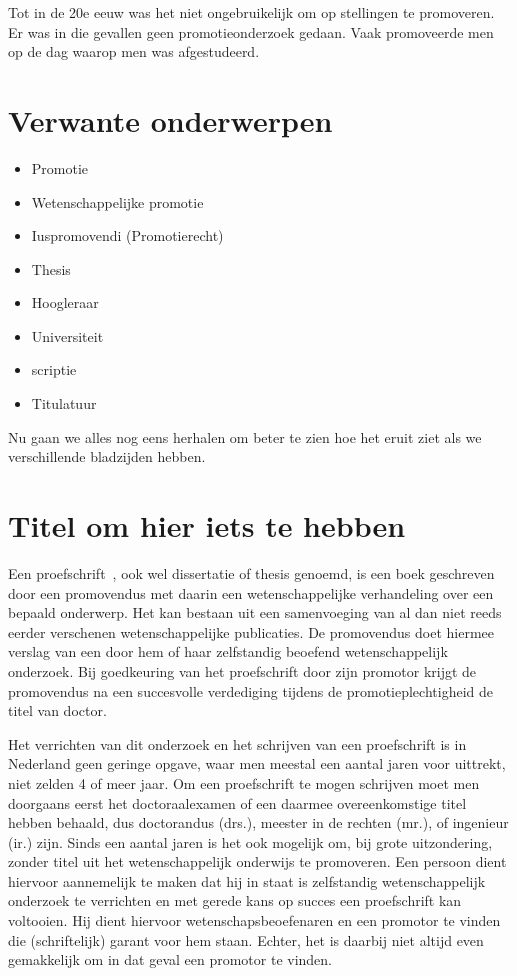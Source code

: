 Tot in de 20e eeuw was het niet ongebruikelijk om op stellingen te
promoveren. Er was in die gevallen geen promotieonderzoek gedaan. Vaak
promoveerde men op de dag waarop men was afgestudeerd.

\section{Verwante onderwerpen}
\label{sec:verwante-onderwerpen}

\begin{itemize}
\item Promotie~\cite{h2g2}
\item Wetenschappelijke promotie
\item Iuspromovendi (Promotierecht)
\item Thesis
\item Hoogleraar
\item Universiteit
\item scriptie\cite{pratchett06:_good_omens}
\item Titulatuur
\end{itemize}


Nu  gaan we  alles nog  eens herhalen  om beter  te zien  hoe het  eruit ziet  als  we verschillende
bladzijden hebben.


\section{Titel om hier iets te hebben}
\label{sec:titel-om-hier}


Een proefschrift~\cite{wiki}, ook wel dissertatie of thesis genoemd, is een boek
geschreven door een promovendus met daarin een wetenschappelijke
verhandeling over een bepaald onderwerp. Het kan bestaan uit een
samenvoeging van al dan niet reeds eerder verschenen wetenschappelijke
publicaties. De promovendus doet hiermee verslag van een door hem of
haar zelfstandig beoefend wetenschappelijk onderzoek. Bij goedkeuring
van het proefschrift door zijn promotor krijgt de promovendus na een
succesvolle verdediging tijdens de promotieplechtigheid de titel van
doctor.

Het verrichten van dit onderzoek en het schrijven van een proefschrift
is in Nederland geen geringe opgave, waar men meestal een aantal jaren
voor uittrekt, niet zelden 4 of meer jaar. Om een proefschrift te
mogen schrijven moet men doorgaans eerst het doctoraalexamen of een
daarmee overeenkomstige titel hebben behaald, dus doctorandus (drs.),
meester in de rechten (mr.), of ingenieur (ir.) zijn. Sinds een aantal
jaren is het ook mogelijk om, bij grote uitzondering, zonder titel uit
het wetenschappelijk onderwijs te promoveren. Een persoon dient
hiervoor aannemelijk te maken dat hij in staat is zelfstandig
wetenschappelijk onderzoek te verrichten en met gerede kans op succes
een proefschrift kan voltooien. Hij dient hiervoor
wetenschapsbeoefenaren en een promotor te vinden die (schriftelijk)
garant voor hem staan. Echter, het is daarbij niet altijd even
gemakkelijk om in dat geval een promotor te vinden.

